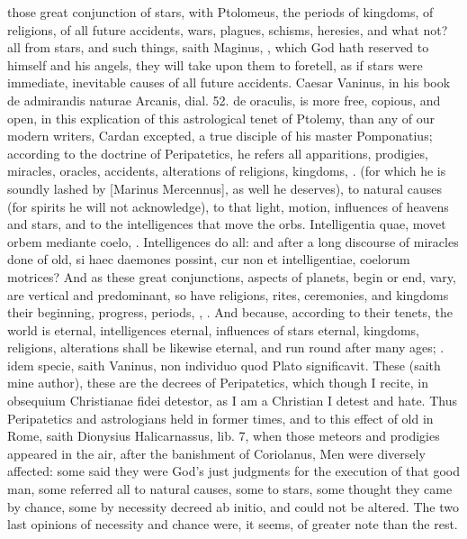{those great conjunction of stars, with Ptolomeus, the periods of
kingdoms, of religions, of all future accidents, wars, plagues,
schisms, heresies, and what not? all from stars, and such things, saith
Maginus, , which God
hath reserved to himself and his angels, they will take upon them to
foretell, as if stars were immediate, inevitable causes of all future
accidents. Caesar Vaninus, in his book \textlatin{de admirandis naturae Arcanis,
dial. 52. de oraculis}, is more free, copious, and open, in this
explication of this astrological tenet of Ptolemy, than any of our
modern writers, Cardan excepted, a true disciple of his master
Pomponatius; according to the doctrine of Peripatetics, he refers all
apparitions, prodigies, miracles, oracles, accidents, alterations of
religions, kingdoms, \etc{}. (for which he is soundly lashed by [Marinus
Mercennus], as well he deserves), to natural causes (for spirits he will
not acknowledge), to that light, motion, influences of heavens and
stars, and to the intelligences that move the orbs. Intelligentia quae,
movet orbem mediante coelo, \etc{}. Intelligences do all: and after a long
discourse of miracles done of old, si haec daemones possint, cur non et
intelligentiae, coelorum motrices? And as these great conjunctions,
aspects of planets, begin or end, vary, are vertical and predominant,
so have religions, rites, ceremonies, and kingdoms their beginning,
progress, periods, , \etc{}. And because, according to their tenets, the world
is eternal, intelligences eternal, influences of stars eternal,
kingdoms, religions, alterations shall be likewise eternal, and run
round after many ages;  \etc{}. idem specie, saith Vaninus, non individuo quod
Plato significavit. These (saith mine author), these are the
decrees of Peripatetics, which though I recite, in obsequium
Christianae fidei detestor, as I am a Christian I detest and hate. Thus
Peripatetics and astrologians held in former times, and to this effect
of old in Rome, saith Dionysius Halicarnassus, lib. 7, when those
meteors and prodigies appeared in the air, after the banishment of
Coriolanus,  Men were diversely affected: some said they were
God's just judgments for the execution of that good man, some referred
all to natural causes, some to stars, some thought they came by chance,
some by necessity decreed ab initio, and could not be altered. The two
last opinions of necessity and chance were, it seems, of greater note
than the rest.

}
